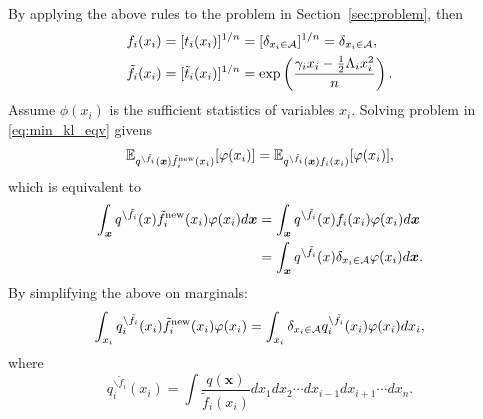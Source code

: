 \documentclass{article}
\begin{document}
By applying the above rules to the problem in Section~\ref{sec:problem}, then
\begin{align}
  f_i(x_i) &= [t_i(x_i)]^{1/n} = [\delta_{x_i \in \mathcal{A}}]^{1/n} = \delta_{x_i \in \mathcal{A}}, \\
  \tilde{f}_{i}(x_i) &= [\tilde{t}_i(x_i)]^{1/n} = \exp\left(\frac{\gamma_i x_i - \frac{1}{2}\Lambda_i x_i^2}{n}\right).
\end{align}
Assume $\phi(x_i)$ is the sufficient statistics of variables $x_i$. Solving problem in \eqref{eq:min_kl_eqv} givens
\begin{align}
  \mathbb{E}_{q^{\backslash \tilde{f}_i}(\bm{x}) \tilde{f}^{\mathrm{new}}_i(x_i)}[\varphi(x_i)] = \mathbb{E}_{q^{\backslash \tilde{f}_i}(\bm{x})f_i(x_i)}[\varphi(x_i)],
\end{align}
which is equivalent to 
\begin{align}
  \int_{\bm{x}} q^{\backslash \tilde{f}_i}(x)\tilde{f}^{\mathrm{new}}_i(x_i) \varphi(x_i) d\bm{x} &= \int_{\bm{x}} q^{\backslash \tilde{f}_i}(x){f}_i(x_i) \varphi(x_i) d\bm{x} \\
                                                                                               &= \int_{\bm{x}} q^{\backslash \tilde{f}_i}(x)\delta_{x_i \in \mathcal{A}} \varphi(x_i) d\bm{x}.
\end{align}
By simplifying the above on marginals:
\begin{equation}
  \int_{x_i} q_i^{\backslash\tilde{f}_i}(x_i) \tilde{f}_i^{\mathrm{new}}(x_i) \varphi(x_i) = \int_{x_i} \delta_{x_i \in \mathcal{A}} q_i^{\backslash \tilde{f}_i}(x_i) \varphi(x_i) d x_i,
\end{equation}
where
\begin{equation}
  q_i^{\backslash\tilde{f}_i}(x_i) = \int \frac{q(\bm{x})}{\tilde{f}_i(x_i)}d x_1 d x_2 \cdots d x_{i-1} d x_{i+1} \cdots d x_n.
\end{equation}
\end{document}
